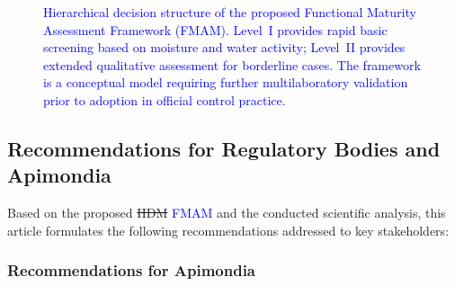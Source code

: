 \begin{figure}[ht]
{}%
\caption{\textcolor{blue}{Hierarchical decision structure of the proposed Functional Maturity Assessment
Framework (FMAM). Level~I provides rapid basic screening based on moisture and water
activity; Level~II provides extended qualitative assessment for borderline cases. The framework
is a conceptual model requiring further multilaboratory validation prior to adoption in
official control practice.}}
\label{fig:fmam}
\end{figure}

\subsection{Recommendations for Regulatory Bodies and Apimondia}

Based on the proposed \sout{HDM} \textcolor{blue}{FMAM} and the conducted scientific analysis,
this article formulates the following recommendations addressed
to key stakeholders:

\subsubsection{Recommendations for Apimondia}


